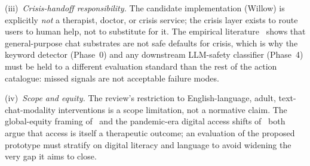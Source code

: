 \documentclass[11pt,a4paper]{article}
\begin{document}
(iii)~\emph{Crisis-handoff responsibility.} The candidate
implementation (Willow) is explicitly \emph{not} a therapist,
doctor, or crisis service; the crisis layer exists to route users
to human help, not to substitute for it. The empirical
literature~\cite{DeFreitas2024ChatbotSafety,Scholich2025TherapistVsChatbot}
shows that general-purpose chat substrates are not safe defaults
for crisis, which is why the keyword detector (Phase~0) and any
downstream LLM-safety classifier (Phase~4) must be held to a
different evaluation standard than the rest of the action
catalogue: missed signals are not acceptable failure modes.

(iv)~\emph{Scope and equity.} The review's restriction to
English-language, adult, text-chat-modality interventions is a
scope limitation, not a normative claim. The global-equity framing
of~\cite{vanHeerden2023LLMGlobalMH} and the pandemic-era digital
access shifts of~\cite{MartinezMartin2020COVIDDigitalMHEthics}
both argue that access is itself a therapeutic outcome; an
evaluation of the proposed prototype must stratify on digital
literacy and language to avoid widening the very gap it aims to
close.

\printbibliography[heading=bibnumbered,title={References}]
\end{document}
